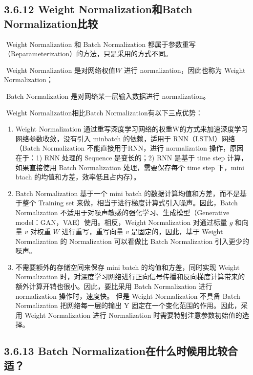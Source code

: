 \subsection{3.6.12 Weight Normalization和Batch
Normalization比较}\label{weight-normalizationux548cbatch-normalizationux6bd4ux8f83}

​ Weight Normalization 和 Batch Normalization
都属于参数重写（Reparameterization）的方法，只是采用的方式不同。

​ Weight Normalization 是对网络权值$ W $ 进行
normalization，因此也称为 Weight Normalization；

​ Batch Normalization 是对网络某一层输入数据进行 normalization。

​ Weight Normalization相比Batch Normalization有以下三点优势：

\begin{enumerate}
\def\labelenumi{\arabic{enumi}.}
\item
  Weight Normalization
  通过重写深度学习网络的权重W的方式来加速深度学习网络参数收敛，没有引入
  minbatch 的依赖，适用于 RNN（LSTM）网络（Batch Normalization
  不能直接用于RNN，进行 normalization 操作，原因在于：1) RNN 处理的
  Sequence 是变长的；2) RNN 是基于 time step 计算，如果直接使用 Batch
  Normalization 处理，需要保存每个 time step 下，mini btach
  的均值和方差，效率低且占内存）。
\item
  Batch Normalization 基于一个 mini batch
  的数据计算均值和方差，而不是基于整个 Training set
  来做，相当于进行梯度计算式引入噪声。因此，Batch Normalization
  不适用于对噪声敏感的强化学习、生成模型（Generative
  model：GAN，VAE）使用。相反，Weight Normalization 对通过标量 $ g $
  和向量 $ v $ 对权重 $ W $ 进行重写，重写向量 $ v $
  是固定的，因此，基于 Weight Normalization 的 Normalization 可以看做比
  Batch Normalization 引入更少的噪声。
\item
  不需要额外的存储空间来保存 mini batch 的均值和方差，同时实现 Weight
  Normalization
  时，对深度学习网络进行正向信号传播和反向梯度计算带来的额外计算开销也很小。因此，要比采用
  Batch Normalization 进行 normalization 操作时，速度快。 但是 Weight
  Normalization 不具备 Batch Normalization 把网络每一层的输出 Y
  固定在一个变化范围的作用。因此，采用 Weight Normalization 进行
  Normalization 时需要特别注意参数初始值的选择。
\end{enumerate}

\subsection{3.6.13 Batch
Normalization在什么时候用比较合适？}\label{batch-normalizationux5728ux4ec0ux4e48ux65f6ux5019ux7528ux6bd4ux8f83ux5408ux9002}

